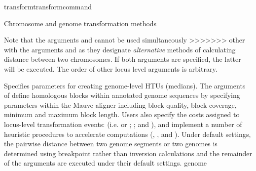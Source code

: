 \begin{command}{transform}{transformcommand}
\begin{arguments}
\begin{argumentgroup}{Chromosome and genome transformation methods}
{\begin{statement}
            \begin{statement}
                Note that the arguments  and
                 cannot be used simultaneously
>>>>>>> other
                with the arguments  and
                 as they designate
                \emph{alternative} methods of calculating distance between two
                chromosomes.  If both arguments are specified, the latter will
                be executed. The order of other locus level arguments is
                arbitrary.
            \end{statement}
    
                {Specifies parameters for creating genome-level HTUs (medians). 
                The arguments of  define 
                homologous blocks within annotated genome sequences by
                specifying parameters within the Mauve aligner \cite{darlingetal2004} 
                including block quality, block coverage, minimum and maximum block
                length. Users also specify the costs assigned to locus-level transformation 
                events: (i.e.   or 
                ; ; and 
                ), and implement a number of heuristic 
                procedures to accelerate computations (, 
                , and ).  
                Under default settings, the pairwise distance between two genome 
                segments or two genomes is determined using breakpoint rather 
                than inversion calculations and the remainder of the arguments are executed 
                under their default settings.}
                {genome}


\end{statement}}
\end{argumentgroup}
\end{arguments}
\end{command}
